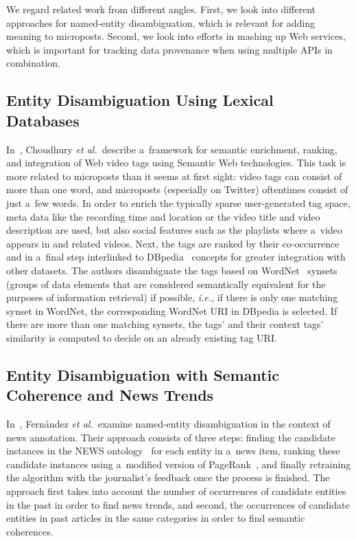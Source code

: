 We regard related work from different angles.
First, we look into different approaches
for named-entity disambiguation,
which is relevant for adding meaning to microposts.
Second, we look into efforts in mashing up Web services,
which is important for tracking data provenance
when using multiple APIs in combination.

\subsection{Entity Disambiguation Using Lexical Databases}

In~\cite{choudhury2009youtubetags},
Choudhury \emph{et al.}\ describe a~framework for
semantic enrichment, ranking, and integration
of Web video tags using Semantic Web technologies.
This task is more related to microposts
than it seems at first sight:
video tags can consist of more than one word,
and microposts (especially on Twitter) oftentimes consist
of just a~few words.
In order to enrich the typically sparse
user-generated tag space,
meta data like the recording time and location
or the video title and video description are used,
but also social features such as the playlists
where a~video appears in and related videos.
Next, the tags are ranked by their co-occurrence
and in a~final step interlinked to DBpedia~\cite{auer2007dbpedia}
concepts for greater integration with other datasets.
The authors disambiguate the tags based on
WordNet~\cite{miller1995wordnet,fellbaum1998wordnet}
synsets (groups of data elements that are considered
semantically equivalent for the purposes of information retrieval)
if possible, \emph{i.e.},
if there is only one matching synset in WordNet,
the corresponding WordNet URI in DBpedia is selected.
If there are more than one matching synsets,
the tags' and their context tags' similarity is computed
to decide on an already existing tag URI.

\subsection{Entity Disambiguation with Semantic Coherence and News Trends}

In~\cite{fernandez2007identityrank},
Fernández \emph{et al.}\ examine named-entity disambiguation
in the context of news annotation.
Their approach consists of three steps:
finding the candidate instances in the NEWS
ontology~\cite{fernandez2010newsontology}
for each entity in a~news item,
ranking these candidate instances
using a~modified version of
PageRank~\cite{brin1998pagerank},
and finally retraining the algorithm
with the journalist's feedback once the process is finished.
The approach first takes into account the number
of occurrences of candidate entities in the past
in order to find news trends,
and second, the occurrences of candidate entities
in past articles in the same categories
in order to find semantic coherences.

